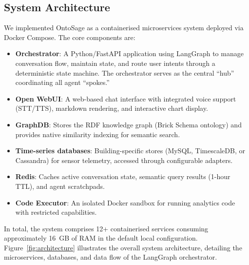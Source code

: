 \documentclass[acmsmall]{acmart}
\begin{document}
\subsection{System Architecture}

We implemented OntoSage as a containerised microservices system deployed via Docker Compose. The core components are:

\begin{itemize}
    \item \textbf{Orchestrator}: A Python/FastAPI application using LangGraph to manage conversation flow, maintain state, and route user intents through a deterministic state machine. The orchestrator serves as the central ``hub'' coordinating all agent ``spokes.''
    \item \textbf{Open WebUI}: A web-based chat interface with integrated voice support (STT/TTS), markdown rendering, and interactive chart display.
    \item \textbf{GraphDB}: Stores the RDF knowledge graph (Brick Schema ontology) and provides native similarity indexing for semantic search.
    \item \textbf{Time-series databases}: Building-specific stores (MySQL, TimescaleDB, or Cassandra) for sensor telemetry, accessed through configurable adapters.
    \item \textbf{Redis}: Caches active conversation state, semantic query results (1-hour TTL), and agent scratchpads.
    \item \textbf{Code Executor}: An isolated Docker sandbox for running analytics code with restricted capabilities.
\end{itemize}

In total, the system comprises 12+ containerised services consuming approximately 16~GB of RAM in the default local configuration. Figure~\ref{fig:architecture} illustrates the overall system architecture, detailing the microservices, databases, and data flow of the LangGraph orchestrator.
\end{document}
